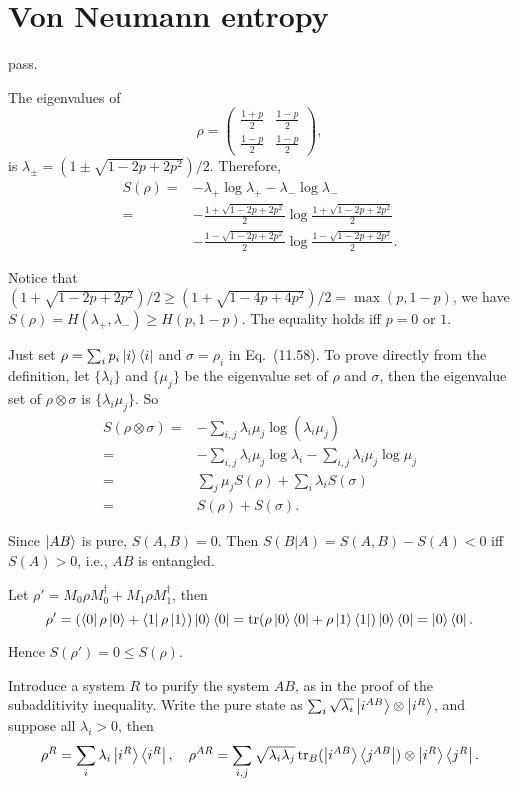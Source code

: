 \section{Von Neumann entropy}

\ex pass.

\ex The eigenvalues of
$$\rho = \begin{pmatrix}
    \frac{1+p}{2} & \frac{1-p}{2} \\
    \frac{1-p}{2} & \frac{1-p}{2}
\end{pmatrix},$$
is $\lambda_\pm = (1\pm\sqrt{1-2p+2p^2})/2$.
Therefore,
$$\begin{aligned}
    S(\rho) = & -\lambda_+\log\lambda_+ -\lambda_-\log\lambda_-
    \\ = & -\frac{1+\sqrt{1-2p+2p^2}}{2}\log\frac{1+\sqrt{1-2p+2p^2}}{2} 
    \\ & -\frac{1-\sqrt{1-2p+2p^2}}{2}\log\frac{1-\sqrt{1-2p+2p^2}}{2}.
\end{aligned}$$

Notice that $(1+\sqrt{1-2p+2p^2})/2 \ge (1+\sqrt{1-4p+4p^2})/2 = \max(p, 1-p)$, we have
$S(\rho) = H(\lambda_+, \lambda_-) \ge H(p, 1-p)$.
The equality holds iff $p=0\text{ or }1$.

\ex Just set $\rho=\sum_ip_i\left|i\right\rangle\left\langle i\right|$ and $\sigma=\rho_i$ in Eq.~(11.58).
To prove directly from the definition, let $\{\lambda_i\}$ and $\{\mu_j\}$ be the eigenvalue set of $\rho$ and $\sigma$, then the eigenvalue set of $\rho\otimes\sigma$ is $\{\lambda_i\mu_j\}$. So
$$\begin{aligned}
S(\rho\otimes\sigma) = & -\sum_{i,j}\lambda_i\mu_j\log(\lambda_i\mu_j)
\\ = & -\sum_{i,j}\lambda_i\mu_j\log\lambda_i -\sum_{i,j}\lambda_i\mu_j\log\mu_j
\\ = & \sum_j\mu_j S(\rho) + \sum_i\lambda_i S(\sigma)
\\ = & S(\rho) + S(\sigma).
\end{aligned}$$

\ex Since $\left|AB\right\rangle$ is pure, $S(A, B) = 0$.
Then $S(B|A)=S(A, B) - S(A) < 0$ iff $S(A) > 0$, i.e., $AB$ is entangled.

\ex Let $\rho'=M_0\rho M_0^\dagger + M_1\rho M_1^\dagger$, then
$$\rho' = (\left\langle0\right|\rho\left|0\right\rangle + \left\langle1\right|\rho\left|1\right\rangle)\left|0\right\rangle\left\langle0\right|
= \operatorname{tr}(\rho\left|0\right\rangle\left\langle0\right| + \rho\left|1\right\rangle\left\langle1\right|)\left|0\right\rangle\left\langle0\right|
= \left|0\right\rangle\left\langle0\right|.$$

Hence $S(\rho')=0 \le S(\rho)$.

\ex Introduce a system $R$ to purify the system $AB$, as in the proof of the subadditivity inequality.
Write the pure state as $\sum_i\sqrt{\lambda_i}\left|i^{AB}\right\rangle\otimes\left|i^R\right\rangle$, and suppose all $\lambda_i > 0$, then
$$
\rho^R = \sum_i \lambda_i\left|i^R\right\rangle\left\langle i^R\right|, \quad
\rho^{AR} = \sum_{i,j} \sqrt{\lambda_i\lambda_j}\operatorname{tr}_B(\left|i^{AB}\right\rangle\left\langle j^{AB}\right|)\otimes\left|i^R\right\rangle\left\langle j^R\right|.
$$

